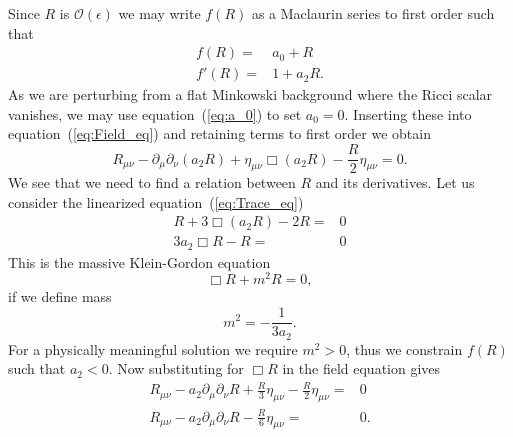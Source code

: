 \documentclass[a4paper, 11pt, titlepage, twoside]{report}
\newcommand{\eqnref}[1]{equation~(\ref{eq:#1})}
\newcommand{\recip}[1]{\ensuremath{\frac{1}{#1}}}
\newcommand{\order}[1]{\ensuremath{\mathcal{O}({#1})}}
\begin{document}
Since $R$ is $\order{\epsilon}$ we may write $f(R)$ as a Maclaurin series to first order such that
\begin{align}
f(R) = {} & a_0 + R\\
f'(R) = {} & 1 + a_2 R.
\end{align}
As we are perturbing from a flat Minkowski background where the Ricci scalar vanishes, we may use \eqnref{a_0} to set $a_0 = 0$. Inserting these into \eqnref{Field_eq} and retaining terms to first order we obtain
\begin{equation}
R_{\mu\nu} - \partial_\mu\partial_\nu(a_2 R) + \eta_{\mu\nu}\Box(a_2 R) - \frac{R}{2}\eta_{\mu\nu} = 0.
\end{equation}
We see that we need to find a relation between $R$ and its derivatives. Let us consider the linearized \eqnref{Trace_eq}
\begin{align}
R + 3 \Box(a_2 R) - 2 R = {} & 0 \nonumber \\
3a_2 \Box R - R = {} & 0
\label{eq:Box_R}
\end{align}
This is the massive Klein-Gordon equation
\begin{equation}
\Box R + m^2R = 0,
\end{equation}
if we define mass
\begin{equation}
m^2 = -\recip{3a_2}.
\end{equation}
For a physically meaningful solution we require $m^2 > 0$, thus we constrain $f(R)$ such that $a_2 < 0$. Now substituting for $\Box R$ in the field equation gives
\begin{align}
R_{\mu\nu} - a_2 \partial_\mu\partial_\nu R + \frac{R}{3}\eta_{\mu\nu} - \frac{R}{2}\eta_{\mu\nu} = {} & 0 \nonumber \\
R_{\mu\nu} - a_2\partial_\mu\partial_\nu R - \frac{R}{6}\eta_{\mu\nu} = {} & 0.
\label{eq:Field}
\end{align}
\end{document}

